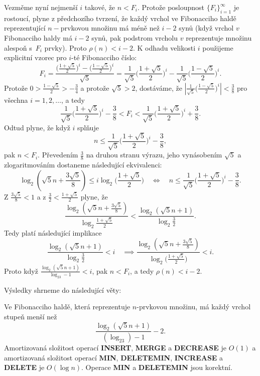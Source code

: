 \documentclass[a4paper,12pt]{article}
\begin{document}
Vezměme nyní nejmenší $i$ takové, že $
n<F_i$. Protože 
posloupnost $\{F_i\}_{i=1}^{\infty}$ je rostoucí, plyne z předchozího 
tvrzení, že každý vrchol ve Fibonacciho haldě 
reprezentující $n-$prvkovou množinu má méně než $
i-2$ 
synů (když vrchol $v$ Fibonacciho haldy má $i-2$ 
synů, pak podstrom vrcholu $v$ reprezentuje 
množinu alespoň s~$F_i$ prvky). Proto $\rho (n)<i-2$. K odhadu 
velikosti $i$ použijeme explicitní vzorec 
pro $i$-té Fibonacciho číslo: 
$$F_i=\frac {\big(\frac {1+\sqrt 5}2\big)^i-\big(\frac {1-\sqrt 5}
2\big)^i}{\sqrt 5}=\frac 1{\sqrt 5}\big(\frac {1+\sqrt 5}2\big)^i
-\frac 1{\sqrt 5}\big(\frac {1-\sqrt 5}2\big)^i.$$
Protože $0>\frac {1-\sqrt 5}2>-\frac 34$ a protože $\sqrt 5
>2$, dostáváme, že $|\frac 1{\sqrt 5}\big(\frac {1-\sqrt 5}
2\big)^i|<\frac 38$ pro všechna 
$i=1,2,\dots$, a tedy 
$$\frac 1{\sqrt 5}\big(\frac {1+\sqrt 5}2\big)^i-\frac 38<F_i<\frac 
1{\sqrt 5}\big(\frac {1+\sqrt 5}2\big)^i+\frac 38.$$
Odtud plyne, že když $i$ splňuje 
$$n\le\frac 1{\sqrt 5}\big(\frac {1+\sqrt 5}2\big)^i-\frac 38,$$
pak $n<F_i$. 
Převedením $\frac 38$ na druhou stranu výrazu, jeho 
vynásobením $\sqrt 5$ a zlogaritmováním dostaneme následující 
ekvivalenci: 
$$\log_2(\sqrt 5n+\frac {3\sqrt 5}8)\le i\log_2\big(\frac {1+\sqrt 
5}2\big)\quad\Leftrightarrow\quad n\le\frac 1{\sqrt 5}\big(\frac {
1+\sqrt 5}2\big)^i-\frac 38.$$
Z $\frac {3\sqrt 5}8<1$ a z $\frac 32<\frac {1+\sqrt 5}2$ plyne, že 
$$\frac {\log_2(\sqrt 5n+\frac {3\sqrt 5}8)}{\log_2\frac {1+\sqrt 
5}2}<\frac {\log_2(\sqrt 5n+1)}{\log_2\frac 32}.$$
Tedy platí následující implikace
$$\frac {\log_2(\sqrt 5n+1)}{\log_2\frac 32}<i\quad\implies\frac {\log_
2(\sqrt 5n+\frac {3\sqrt 5}8)}{\log_2\big(\frac {1+\sqrt 5}2\big)}
<i.$$
Proto když $\frac {\log_2(\sqrt 5n+1)}{\log_23-1}<i$, pak $n<F_
i$, a tedy $\rho (n)<i-2$.

Výsledky shrneme do následující věty: 

\begin{veta}Ve Fibonacciho haldě, která   
reprezentuje $n$-prvkovou množinu, má každý vrchol 
stu\-peň menší než 
$$\frac {\log_2(\sqrt 5n+1)}{(\log_23)-1}-2.$$
Amortizovaná složitost operací {\bf INSERT}, {\bf MERGE} a {\bf DECREASE }
je $O(1)$ a amortizovaná složitost operací {\bf MIN}, 
{\bf DE\-LE\-TE\-MIN}, {\bf INCREASE} a {\bf DELETE} je $O(\log n
)$. Operace {\bf MIN }
a {\bf DELETEMIN} jsou korektní.
\end{veta}
\end{document}
